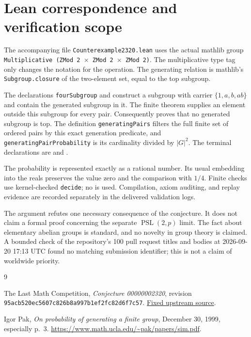 \documentclass[11pt]{article}
\begin{document}
\section*{Lean correspondence and verification scope}
\begingroup\raggedright
The accompanying file \texttt{Counterexample2320.lean} uses the actual mathlib
group \texttt{Multiplicative (ZMod 2 $\times$ ZMod 2 $\times$ ZMod 2)}.
The multiplicative type tag only changes the notation for the operation.
The generating relation is mathlib's \texttt{Subgroup.closure} of the two-element
set, equal to the top subgroup.

The declarations \texttt{fourSubgroup} and
\texttt{} construct a subgroup with carrier
$\{1,a,b,ab\}$ and contain the generated subgroup in it.
The finite theorem \texttt{} supplies an element
outside this subgroup for every pair.  Consequently
\texttt{} proves that no generated subgroup is top.
The definition \texttt{generatingPairs} filters the full finite set of ordered
pairs by this exact generation predicate, and
\texttt{generatingPairProbability} is its cardinality divided by $|G|^2$.
The terminal declarations are
\texttt{} and
\texttt{}.
\par\endgroup

The probability is represented exactly as a rational number.  Its usual
embedding into the reals preserves the value zero and the comparison with
$1/4$.  Finite checks use kernel-checked \texttt{decide}; no
\texttt{} is used.  Compilation, axiom auditing, and
replay evidence are recorded separately in the delivered validation logs.

The argument refutes one necessary consequence of the conjecture.  It does
not claim a formal proof concerning the separate $\operatorname{PSL}(2,p)$
limit.  The fact about elementary abelian groups is standard, and no novelty
in group theory is claimed.  A bounded check of the repository's 100 pull
request titles and bodies at 2026-09-20 17:13 UTC found no matching submission
identifier; this is not a claim of worldwide priority.

\begin{thebibliography}{9}
\raggedright
{}
The Last Math Competition,
\emph{Conjecture 00000002320}, revision
\texttt{95acb520ec5607c826b8a997b1ef2fc82d6f7c57}.
\href{https://github.com/The-Last-Math-Competition/The-Last-Math-Competition/blob/95acb520ec5607c826b8a997b1ef2fc82d6f7c57/conjectures/00000002320.md}{Fixed upstream source}.

Igor Pak,
\emph{On probability of generating a finite group},
December 30, 1999, especially p.~3.
\url{https://www.math.ucla.edu/~pak/papers/sim.pdf}.
\end{thebibliography}
\end{document}

